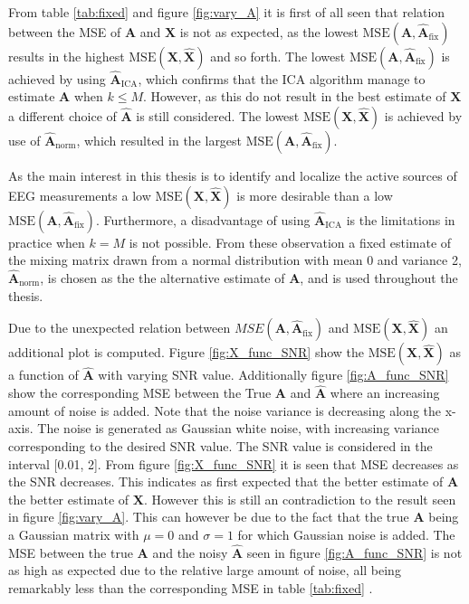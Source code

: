 From table \ref{tab:fixed} and figure \ref{fig:vary_A} it is first of all seen that relation between the MSE of $\textbf{A}$ and $\textbf{X}$ is not as expected, as the lowest $\text{MSE}(\mathbf{A}, \hat{\mathbf{A}}_{\text{fix}})$ results in the highest $\text{MSE}(\mathbf{X}, \hat{\mathbf{X}})$ and so forth. 
The lowest $\text{MSE}(\mathbf{A}, \hat{\mathbf{A}}_{\text{fix}})$ is achieved by using $\hat{\mathbf{A}}_{\text{ICA}}$, which confirms that the ICA algorithm manage to estimate $\mathbf{A}$ when $k \leq M$. 
However, as this do not result in the best estimate of $\mathbf{X}$ a different choice of $\hat{\mathbf{A}}$ is still considered. 
The lowest $\text{MSE}(\mathbf{X}, \hat{\mathbf{X}})$ is achieved by use of $\hat{\mathbf{A}}_{\text{norm}}$, which resulted in the largest $\text{MSE}(\mathbf{A}, \hat{\mathbf{A}}_{\text{fix}})$. 
      
As the main interest in this thesis is to identify and localize the active sources of EEG measurements a low $\text{MSE}(\mathbf{X}, \hat{\mathbf{X}})$ is more desirable than a low $\text{MSE}(\mathbf{A}, \hat{\mathbf{A}}_{\text{fix}})$. 
Furthermore, a disadvantage of using $\hat{\mathbf{A}}_{\text{ICA}}$ is the limitations in practice when $k = M$ is not possible.     
From these observation a fixed estimate of the mixing matrix drawn from a normal distribution with mean 0 and variance 2, $\hat{\mathbf{A}}_{\text{norm}}$, is chosen as the the alternative estimate of $\mathbf{A}$, and is used throughout the thesis. 

Due to the unexpected relation between $MSE(\mathbf{A}, \hat{\mathbf{A}}_{\text{fix}})$ and $\text{MSE}(\mathbf{X}, \hat{\mathbf{X}})$ an additional plot is computed. Figure \ref{fig:X_func_SNR} show the $\text{MSE}(\mathbf{X}, \hat{\mathbf{X}})$ as a function of $\hat{\textbf{A}}$ with varying SNR value. 
Additionally figure \ref{fig:A_func_SNR} show the corresponding MSE between the True $\textbf{A}$ and $\hat{\textbf{A}}$ where an increasing amount of noise is added.
Note that the noise variance is decreasing along the x-axis. 
The noise is generated as Gaussian white noise, with increasing variance corresponding to the desired SNR value. The SNR value is considered in the interval [0.01, 2]. 
From figure \ref{fig:X_func_SNR} it is seen that MSE decreases as the SNR decreases. This indicates as first expected that the better estimate of $\textbf{A}$ the better estimate of $\textbf{X}$. However this is still an contradiction to the result seen in figure \ref{fig:vary_A}. 
This can however be due to the fact that the true $\textbf{A}$ being a Gaussian matrix with $\mu = 0$ and $\sigma = 1$ for which Gaussian noise is added. The MSE between the true $\textbf{A}$ and the noisy $\hat{\textbf{A}}$ seen in figure \ref{fig:A_func_SNR} is not as high as expected due to the relative large amount of noise, all being remarkably less than the corresponding MSE in table \ref{tab:fixed} .  


